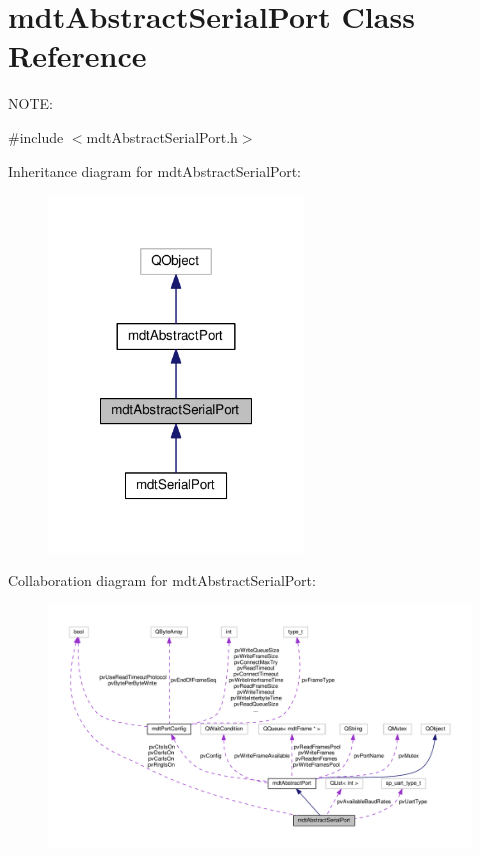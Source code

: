\hypertarget{classmdt_abstract_serial_port}{\section{mdt\-Abstract\-Serial\-Port Class Reference}
\label{classmdt_abstract_serial_port}
}


N\-O\-T\-E\-:  




{\ttfamily \#include $<$mdt\-Abstract\-Serial\-Port.\-h$>$}



Inheritance diagram for mdt\-Abstract\-Serial\-Port\-:\nopagebreak
\begin{figure}[H]
\begin{center}
\leavevmode
\includegraphics[width=192pt]{classmdt_abstract_serial_port__inherit__graph}
\end{center}
\end{figure}


Collaboration diagram for mdt\-Abstract\-Serial\-Port\-:\nopagebreak
\begin{figure}[H]
\begin{center}
\leavevmode
\includegraphics[width=350pt]{classmdt_abstract_serial_port__coll__graph}
\end{center}
\end{figure}
